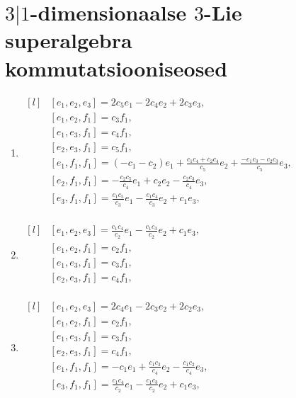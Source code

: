 
\appendix
\section{\texorpdfstring{$3|1$}{3|1}-dimensionaalse
    \texorpdfstring{$3$}{3}-Lie superalgebra kommutatsiooniseosed
}\label{lias:3|1 kommutatsiooniseosed}

\begin{enumerate}
    \item $\begin{matrix*}[l]
            & [e_1, e_2, e_3] = 2 c_{5} e_1 - 2 c_{4} e_2 + 2 c_{3} e_3, \\
            & [e_1, e_2, f_1] = c_{3} f_1, \\
            & [e_1, e_3, f_1] = c_{4} f_1, \\
            & [e_2, e_3, f_1] = c_{5} f_1, \\
            & [e_1, f_1, f_1] = \left(-c_{1} - c_{2}\right) e_1 + \frac{c_{1} c_{4} + c_{2} c_{4}}{c_{5}} e_2 + \frac{-c_{1} c_{3} - c_{2} c_{3}}{c_{5}} e_3, \\
            & [e_2, f_1, f_1] = -\frac{c_{2} c_{5}}{c_{4}} e_1 + c_{2} e_2 - \frac{c_{2} c_{3}}{c_{4}} e_3, \\
            & [e_3, f_1, f_1] = \frac{c_{1} c_{5}}{c_{3}} e_1 - \frac{c_{1} c_{4}}{c_{3}} e_2 + c_{1} e_3, \\
        \end{matrix*}$

    \item $\begin{matrix*}[l]
            & [e_1, e_2, e_3] = \frac{c_{1} c_{4}}{c_{2}} e_1 - \frac{c_{1} c_{3}}{c_{2}} e_2 + c_{1} e_3, \\
            & [e_1, e_2, f_1] = c_{2} f_1, \\
            & [e_1, e_3, f_1] = c_{3} f_1, \\
            & [e_2, e_3, f_1] = c_{4} f_1, \\
        \end{matrix*}$

    \item $\begin{matrix*}[l]
            & [e_1, e_2, e_3] = 2 c_{4} e_1 - 2 c_{3} e_2 + 2 c_{2} e_3, \\
            & [e_1, e_2, f_1] = c_{2} f_1, \\
            & [e_1, e_3, f_1] = c_{3} f_1, \\
            & [e_2, e_3, f_1] = c_{4} f_1, \\
            & [e_1, f_1, f_1] = -c_{1} e_1 + \frac{c_{1} c_{3}}{c_{4}} e_2 - \frac{c_{1} c_{2}}{c_{4}} e_3, \\
            & [e_3, f_1, f_1] = \frac{c_{1} c_{4}}{c_{2}} e_1 - \frac{c_{1} c_{3}}{c_{2}} e_2 + c_{1} e_3, \\
        \end{matrix*}$


\end{enumerate}

